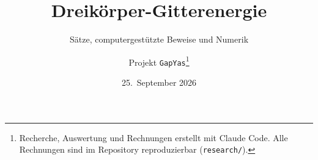 \documentclass[11pt,a4paper,parskip=half,toc=sectionentrywithdots]{scrartcl}
\title{Dreikörper-Gitterenergie}
\subtitle{Sätze, computergestützte Beweise und Numerik}
\author{Projekt \texttt{GapYas}\thanks{Recherche, Auswertung und Rechnungen erstellt mit Claude Code. Alle Rechnungen sind im Repository reproduzierbar (\texttt{research/}).}}
\date{25.~September 2026}
\begin{document}
\maketitle
\begin{abstract}
\noindent

\end{abstract}
\tableofcontents
\clearpage

\end{document}
